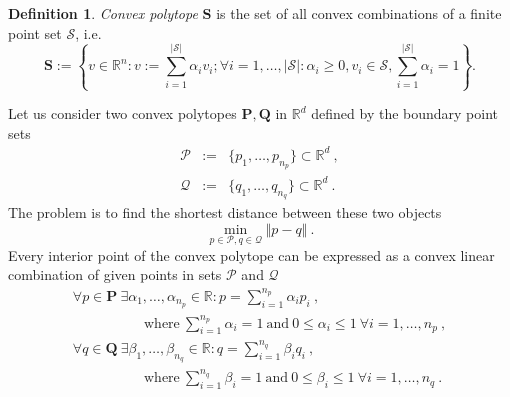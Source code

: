 \documentclass{article}
\theoremstyle{definition}
\newtheorem{definition}{Definition}
\begin{document}
\begin{definition}
\emph{Convex polytope} $\mathbf{S}$ is the set of all convex combinations of a finite point set $ \mathcal{S}$, i.e.
\begin{displaymath}
 \mathbf{S} :=
 \left\lbrace 
 v \in \mathbb{R}^n: v := \sum\limits_{i=1}^{\vert \mathcal{S} \vert} \alpha_i v_i; 
	\forall i = 1,\dots,\vert \mathcal{S} \vert: \alpha_i \geq 0, v_i \in \mathcal{S}, 
	\sum\limits_{i=1}^{\vert \mathcal{S} \vert} \alpha_i = 1 
 \right\rbrace.
\end{displaymath}
\end{definition}

Let us consider two convex polytopes $\mathbf{P}, \mathbf{Q}$ in $\mathbb{R}^d$ defined by the boundary point sets
\begin{displaymath}
 \begin{array}{rcll}
  \mathcal{P} & := & \lbrace p_1, \dots, p_{n_p} \rbrace \subset \mathbb{R}^d ~\mathrm{,} \\
  \mathcal{Q} & := & \lbrace q_1, \dots, q_{n_q} \rbrace \subset \mathbb{R}^d ~\mathrm{.}
 \end{array}
\end{displaymath}
The problem is to find the shortest distance between these two objects
\begin{equation}
 \label{eq:polytope_problem1}
 \min\limits_{p \in \mathcal{P}, q \in \mathcal{Q}} \Vert p - q \Vert ~\mathrm{.}
\end{equation}
Every interior point of the convex polytope can be expressed as a convex linear combination of given points in sets $\mathcal{P}$ and $\mathcal{Q}$
\begin{equation}
 \label{eq:polytope_linear_comb}
 \begin{array}{l}
  \forall p \in \mathbf{P} ~ \exists \alpha_1, \dots, \alpha_{n_p} \in \mathbb{R}: p = \sum\limits_{i = 1}^{n_p} \alpha_{i} p_i ~\mathcal{,} \\
	~~~~~~~~~~~~~~~~~~~~~~~ \mathrm{where} ~ \sum\limits_{i = 1}^{n_p} \alpha_i = 1 ~ \mathrm{and} ~ 0 \leq \alpha_i \leq 1 ~\forall i = 1,\dots,n_p ~\mathrm{,} \\
  \forall q \in \mathbf{Q} ~ \exists \beta_1, \dots, \beta_{n_q} \in \mathbb{R}: q = \sum\limits_{i = 1}^{n_q} \beta_{i} q_i ~\mathcal{,} \\
	~~~~~~~~~~~~~~~~~~~~~~~ \mathrm{where} ~ \sum\limits_{i = 1}^{n_q} \beta_i = 1 ~ \mathrm{and} ~ 0 \leq \beta_i \leq 1 ~\forall i = 1,\dots,n_q ~\mathrm{.}
 \end{array}
\end{equation} 
\end{document}
